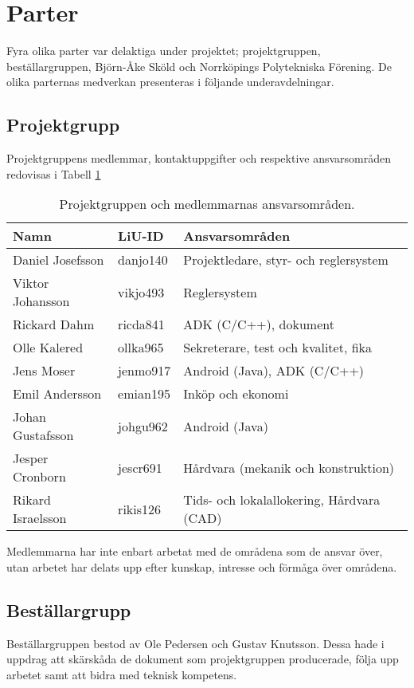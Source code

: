 \section{Parter}
Fyra olika parter var delaktiga under projektet; projektgruppen,
beställargruppen, Björn-Åke Sköld och Norrköpings Polytekniska Förening. De
olika parternas medverkan presenteras i följande underavdelningar.

\subsection{Projektgrupp}
Projektgruppens medlemmar, kontaktuppgifter och respektive ansvarsområden
redovisas i Tabell \ref{tbl:projektgruppen}

\begin{table}[htbp!]
\label{tbl:projektgruppen}
\caption{Projektgruppen och medlemmarnas ansvarsområden.}
\centering
\begin{tabular}{|l|l|p{}|}
\hline
Namn & LiU-ID & Ansvarsområden \\
\hline
\hline
Daniel Josefsson & danjo140 & Projektledare, styr- och reglersystem \\
Viktor Johansson & vikjo493 & Reglersystem \\
Rickard Dahm & ricda841 & ADK (C/C++), dokument \\
Olle Kalered & ollka965 & Sekreterare, test och kvalitet, fika \\
Jens Moser & jenmo917 & Android (Java), ADK (C/C++) \\
Emil Andersson & emian195 & Inköp och ekonomi \\
Johan Gustafsson & johgu962 & Android (Java) \\
Jesper Cronborn & jescr691 & Hårdvara (mekanik och konstruktion)\\
Rikard Israelsson & rikis126 & Tids- och lokalallokering, \newline 
Hårdvara (CAD) \\
\hline
\end{tabular}
\end{table}

Medlemmarna har inte enbart arbetat med de områdena som de ansvar över, utan
arbetet har delats upp efter kunskap, intresse och förmåga över områdena.

\subsection{Beställargrupp}
Beställargruppen bestod av Ole Pedersen och Gustav Knutsson. Dessa hade i
uppdrag att skärskåda de dokument som projektgruppen producerade, följa upp
arbetet samt att bidra med teknisk kompetens.

